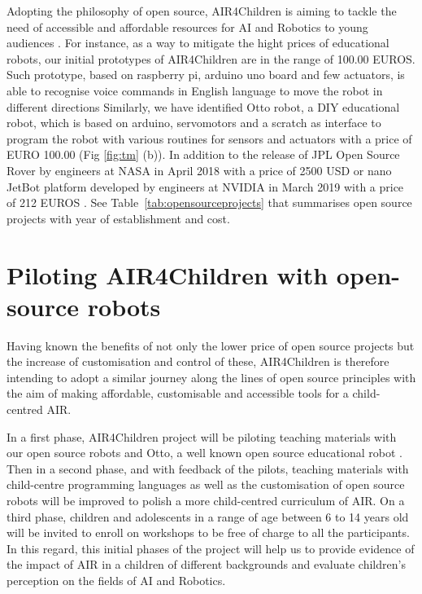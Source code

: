 \documentclass[sigconf]{acmart}
\begin{document}
Adopting the philosophy of open source, AIR4Children is aiming to tackle the need of accessible and affordable resources for AI and Robotics to young audiences \cite{UNICEF2020}.
For instance, as a way to mitigate the hight prices of educational robots, our initial prototypes of AIR4Children are in the range of 100.00 EUROS. 
Such prototype, based on raspberry pi, arduino uno board and few actuators, is able to recognise voice commands in English language to move the robot in different directions 
Similarly, we have identified Otto robot, a DIY educational robot, which is based on arduino, servomotors and a scratch as interface to program the robot with various routines for sensors and actuators with a price of EURO 100.00 (Fig \ref{fig:tm} (b)). 
In addition to the release of JPL Open Source Rover by engineers at NASA in April 2018 with a price of 2500 USD \cite{OSR:2018} or
nano JetBot platform developed by engineers at NVIDIA in March 2019 with a price of 212 EUROS \cite{nanoJetBot:2019}. 
See Table~\ref{tab:opensourceprojects} that summarises open source projects with year of establishment and cost.


\section{Piloting AIR4Children with open-source robots}
Having known the benefits of not only the lower price of open source projects but the increase of customisation and control of these, AIR4Children is therefore intending to adopt a similar journey along the lines of open source principles with the aim of making affordable, customisable and accessible tools for a child-centred AIR.

In a first phase, AIR4Children project will be piloting teaching materials with our open source robots and Otto, a well known open source educational robot \cite{OttoDIY:2016}.  
Then in a second phase, and with feedback of the pilots, teaching materials with child-centre programming languages as well as the customisation of open source robots will be improved to polish a more child-centred curriculum of AIR. 
On a third phase, children and adolescents in a range of age between 6 to 14 years old will be invited to enroll on workshops to be free of charge to all the participants. 
In this regard, this initial phases of the project will help us to provide evidence of the impact of AIR in a children of different backgrounds and evaluate children's perception on the fields of AI and Robotics.  
\end{document}
